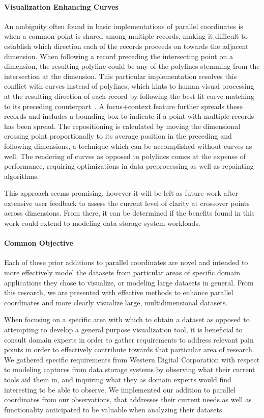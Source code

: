 \documentclass[journal]{vgtc}                %
\begin{document}
\paragraph{Visualization Enhancing Curves}
\label{curves}
An ambiguity often found in basic implementations of parallel coordinates is when a common point is shared among multiple records, making it difficult to establish which direction each of the records proceeds on towards the adjacent dimension. When following a record preceding the intersecting point on a dimension, the resulting polyline could be any of the polylines stemming from the intersection at the dimension. This particular implementation resolves this conflict with curves instead of polylines, which hints to human visual processing at the resulting direction of each record by following the best fit curve matching to its preceding counterpart~\cite{Graham:2003:UCE}. A focus+context feature further spreads these records and includes a bounding box to indicate if a point with multiple records has been spread. The repositioning is calculated by moving the dimensional crossing point proportionally to its average position in the preceding and following dimensions, a technique which can be accomplished without curves as well. The rendering of curves as opposed to polylines comes at the expense of performance, requiring optimizations in data preprocessing as well as repainting algorithms.

This approach seems promising, however it will be left as future work after extensive user feedback to assess the current level of clarity at crossover points across dimensions. From there, it can be determined if the benefits found in this work could extend to modeling data storage system workloads.

\paragraph{Common Objective}
\label{common_objective}
Each of these prior additions to parallel coordinates are novel and intended to more effectively model the datasets from particular areas of specific domain applications they chose to visualize, or modeling large datasets in general. From this research, we are presented with effective methods to enhance parallel coordinates and more clearly visualize large, multidimensional datasets.

When focusing on a specific area with which to obtain a dataset as opposed to attempting to develop a general purpose visualization tool, it is beneficial to consult domain experts in order to gather requirements to address relevant pain points in order to effectively contribute towards that particular area of research. We gathered specific requirements from Western Digital Corporation with respect to modeling captures from data storage systems by observing what their current tools aid them in, and inquiring what they as domain experts would find interesting to be able to observe. We implemented our addition to parallel coordinates from our observations, that addresses their current needs as well as functionality anticipated to be valuable when analyzing their datasets.
\end{document}
